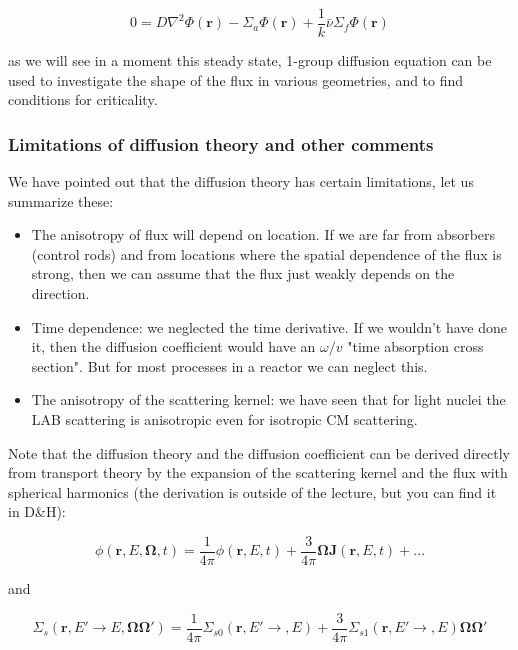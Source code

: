 \begin{equation}
0=D\nabla^2 \Phi(\mathbf{r})-\Sigma_a\Phi(\mathbf{r})+\frac{1}{k}\bar\nu\Sigma_f\Phi(\mathbf{r})
\end{equation}

\noindent as we will see in a moment this steady state, 1-group diffusion equation can be used to investigate the shape of the flux in various geometries, and to find conditions for criticality.

\subsubsection{Limitations of diffusion theory and other comments}

We have pointed out that the diffusion theory has certain limitations, let us summarize these:

\begin{itemize}
\item The anisotropy of flux will depend on location. If we are far from absorbers (control rods) and from locations where the spatial dependence of the flux is strong, then we can assume that the flux just weakly depends on the direction.

\item Time dependence: we neglected the time derivative. If we wouldn't have done it, then the diffusion coefficient would have an $\omega/v$ "time absorption cross section". But for most processes in a reactor we can neglect this.

\item The anisotropy of the scattering kernel: we have seen that for light nuclei the LAB scattering is anisotropic even for isotropic CM scattering. 
\end{itemize}

Note that the diffusion theory and the diffusion coefficient can be derived directly from transport theory by the expansion of the scattering kernel and the flux with spherical harmonics (the derivation is outside of the lecture, but you can find it in D\&H):

$$\phi(\mathbf{r},E,\mathbf{\Omega},t)=\frac{1}{4\pi}\phi(\mathbf{r},E,t)+\frac{3}{4\pi}\mathbf{\Omega}\mathbf{J}(\mathbf{r},E,t)+...$$

and

$$\Sigma_s(\mathbf{r},E'\rightarrow E,\mathbf{\Omega\Omega}')=\frac{1}{4\pi}\Sigma_{s0}(\mathbf{r},E'\rightarrow,E)+\frac{3}{4\pi}\Sigma_{s1}(\mathbf{r},E'\rightarrow,E)\mathbf{\Omega\Omega}'$$

